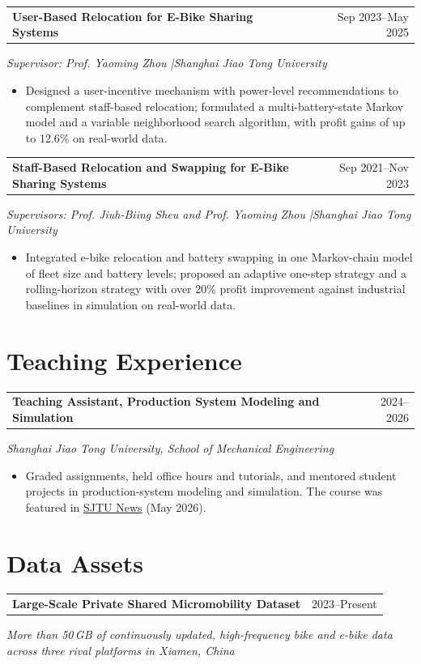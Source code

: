 \documentclass[11pt,letterpaper]{article}
\makeatletter
\newcommand{\entry}[3]{%
  \Needspace{4\baselineskip}%
  \begin{tabularx}{\linewidth}{@{}Xr@{}}
    \textbf{#1} & {\small #2}
  \end{tabularx}\par
  {\small\itshape #3\par}
}
\makeatother
\begin{document}
\entry{User-Based Relocation for E-Bike Sharing Systems}{Sep 2023--May 2025}
  {Supervisor: Prof. Yaoming Zhou \enspace|\enspace Shanghai Jiao Tong University}
\begin{itemize}
  \item Designed a user-incentive mechanism with power-level recommendations to complement staff-based relocation; formulated a multi-battery-state Markov model and a variable neighborhood search algorithm, with profit gains of up to 12.6\% on real-world data.
\end{itemize}
\vspace{2pt}

\entry{Staff-Based Relocation and Swapping for E-Bike Sharing Systems}{Sep 2021--Nov 2023}
  {Supervisors: Prof. Jiuh-Biing Sheu and Prof. Yaoming Zhou \enspace|\enspace Shanghai Jiao Tong University}
\begin{itemize}
  \item Integrated e-bike relocation and battery swapping in one Markov-chain model of fleet size and battery levels; proposed an adaptive one-step strategy and a rolling-horizon strategy with over 20\% profit improvement against industrial baselines in simulation on real-world data.
\end{itemize}

\section*{Teaching Experience}

\entry{Teaching Assistant, Production System Modeling and Simulation}{2024--2026}
  {Shanghai Jiao Tong University, School of Mechanical Engineering}
\begin{itemize}
  \item Graded assignments, held office hours and tutorials, and mentored student projects in production-system modeling and simulation. The course was featured in \href{https://news.sjtu.edu.cn/ztzl_aijyzl/20260508/222473.html}{SJTU News} (May 2026).
\end{itemize}

\section*{Data Assets}

\entry{Large-Scale Private Shared Micromobility Dataset}{2023--Present}
  {More than 50\,GB of continuously updated, high-frequency bike and e-bike data across three rival platforms in Xiamen, China}
\end{document}
